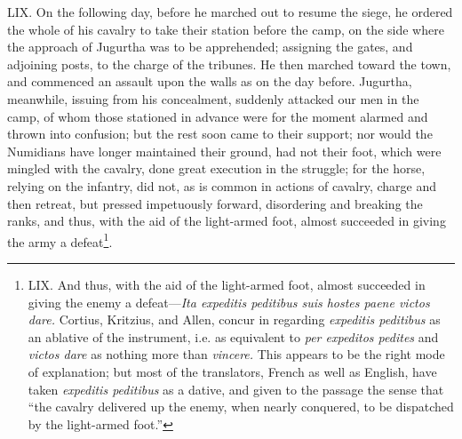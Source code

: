LIX. On the following day, before he marched out to resume the siege,
he ordered the whole of his cavalry to take their station before the
camp, on the side where the approach of Jugurtha was to be apprehended;
assigning the gates, and adjoining posts, to the charge of the tribunes.
He then marched toward the town, and commenced an assault upon the walls
as on the day before. Jugurtha, meanwhile, issuing from his concealment,
suddenly attacked our men in the camp, of whom those stationed in advance
were for the moment alarmed and thrown into confusion; but the rest soon
came to their support; nor would the Numidians have longer maintained
their ground, had not their foot, which were mingled with the cavalry,
done great execution in the struggle; for the horse, relying on the
infantry, did not, as is common in actions of cavalry, charge and then
retreat, but pressed impetuously forward, disordering and breaking the
ranks, and thus, with the aid of the light-armed foot, almost succeeded
in giving the army a defeat\footnote{LIX. And thus, with the aid of the light-armed foot, almost
succeeded in giving the enemy a defeat—\emph{Ita expeditis peditibus suis
hostes paene victos dare.} Cortius, Kritzius, and Allen, concur in
regarding \emph{expeditis peditibus} as an ablative of the instrument, i.e.
as equivalent to \emph{per expeditos pedites} and \emph{victos dare} as nothing
more than \emph{vincere.} This appears to be the right mode of explanation;
but most of the translators, French as well as English, have taken
\emph{expeditis peditibus} as a dative, and given to the passage the sense
that ``the cavalry delivered up the enemy, when nearly conquered, to be
dispatched by the light-armed foot.''}.

